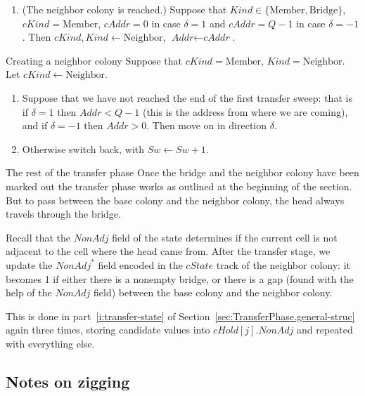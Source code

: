 \documentclass[12pt]{memoir}
\newcommand{\fld}[1]{\ensuremath{\textit{#1}}}
\newcommand{\Addr}{\fld{Addr}}
\newcommand{\cAddr}{\fld{cAddr}}
\renewcommand{\G}{\fld{NonAdj}} %
\newcommand{\cHold}{\fld{cHold}}
\newcommand{\Kind}{\fld{Kind}}
\newcommand{\cKind}{\fld{cKind}}
\newcommand{\cState}{\fld{cState}}
\newcommand{\Sweep}{\fld{Sw}}
\newcommand{\Bridge}{\mathrm{Bridge}}
\newcommand{\Member}{\mathrm{Member}}
\newcommand{\Neighbor}{\mathrm{Neighbor}}
\begin{document}
\begin{flushdescription}
\begin{enumerate}[1.]
\item (The neighbor colony is reached.) 
  Suppose that $\Kind \in \{\Member,\Bridge \}$, $\cKind = \Member$, 
  $\cAddr = 0$ in case \( \delta=1 \) and $\cAddr =  Q-1$ in case \( \delta=-1 \).
  Then $\cKind, \Kind \gets \Neighbor$, $\Addr \gets \cAddr$.

  \end{enumerate}

  \item[Creating a neighbor colony]
    Suppose that $\cKind = \Member$, $\Kind  =\Neighbor$.
Let $\cKind \gets \Neighbor$.

    \begin{enumerate}[1.]
    \item Suppose that we have not reached the end of the first transfer sweep: that is 
if \( \delta=1 \) then \( \Addr<Q-1 \) (this is the address from where we are coming), 
and if \( \delta=-1 \) then \( \Addr>0 \).
Then move on in direction \( \delta \).
    \item Otherwise switch back, with \( \Sweep\gets\Sweep+1 \).
    \end{enumerate}

  \item[The rest of the transfer phase]
Once the bridge and the neighbor colony have been marked out the transfer phase
works as outlined at the beginning of the section.
But to pass between the base colony and the neighbor colony, the head always travels
through the bridge.

    \end{flushdescription}

Recall that the $\G$ field of the state determines
if the current cell is not adjacent to the cell  where the head came from.
After the transfer stage, we update the $\G^{*}$ field encoded in the
$\cState$ track of the neighbor colony: it becomes 1 if either there is a nonempty bridge,
or there is a gap (found with the help of the \( \G \) field) between the base colony
and the neighbor colony.

This is done in part~\ref{i:transfer-state} 
of Section~\ref{sec:TransferPhase.general-struc}
again three times, storing candidate values into $\cHold[j].\G$
and repeated with everything else.

 \subsection{Notes on zigging}\label{sec:zigging}
\end{document}
